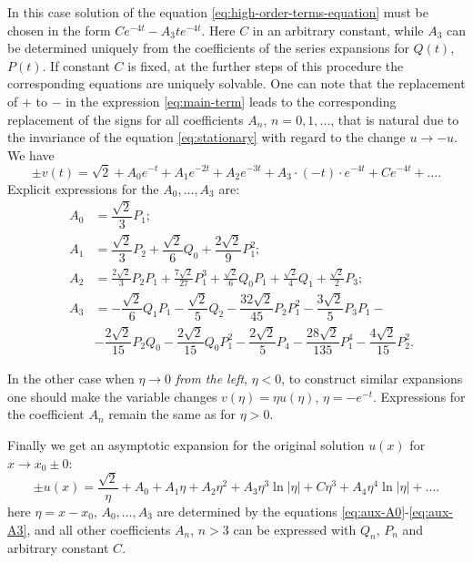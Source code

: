 In this case solution of the equation \eqref{eq:high-order-terms-equation} must be chosen in the form $Ce^{-4t} - A_3 t e^{-4t}$.
Here $C$ in an arbitrary constant, while $A_3$ can be determined uniquely from the coefficients of the series expansions for $Q(t)$, $P(t)$.
If constant $C$ is fixed, at the further steps of this procedure the corresponding equations are uniquely solvable.
One can note that the replacement of $+$ to $-$ in the expression \eqref{eq:main-term} leads to the corresponding replacement of the signs for all coefficients $A_n$, $n = 0, 1,...$, that is natural due to the invariance of the equation \eqref{eq:stationary} with regard to the change $u \to -u$.
We have
\begin{equation}
	\pm v(t) = \sqrt{2} + A_0 e^{-t} + A_1 e^{-2t} + A_2 e^{-3t} + A_3 \cdot (-t) \cdot e^{-4t} + C e^{-4t} + \dots.
	\label{eq:expansion-intermediate}
\end{equation}
Explicit expressions for the $A_0, \dots, A_3$ are:
\begin{eqnarray}
	& A_0 & = \dfrac{\sqrt{2}}{3} P_1; \label{eq:aux-A0} \\
	& A_1 & = \dfrac{\sqrt{2}}{3} P_2 + \dfrac{\sqrt{2}}{6} Q_0 + \dfrac{2 \sqrt{2}}{9} P_1^2; \label{eq:aux-A1} \\
	& A_2 & = \frac{2\sqrt{2}} 3P_2 P_1 + \frac{7\sqrt{2}}{27} P_1^3 + \frac{\sqrt{2}} 6Q_0 P_1 + \frac{\sqrt{2}} 4Q_1 + \frac{\sqrt{2}} 2P_3; \label{eq:aux-A2} \\
	& A_3 & = -\dfrac{\sqrt{2}}{6} Q_1 P_1 - \dfrac{\sqrt{2}}{5} Q_2 - \dfrac{32 \sqrt{2}}{45} P_2 P_1^2 - \dfrac{3 \sqrt{2}}{5} P_3 P_1 - \\
	&& - \dfrac{2 \sqrt{2}}{15} P_2 Q_0 -\dfrac{2 \sqrt{2}}{15} Q_0 P_1^2 - \dfrac{2 \sqrt{2}}{5} P_4 - \dfrac{28 \sqrt{2}}{135} P_1^4 - \dfrac{4 \sqrt{2}}{15} P_2^2. \label{eq:aux-A3}
\end{eqnarray}

In the other case when $\eta \to 0$ {\it from the left}, $\eta < 0$, to construct similar expansions one should make the variable changes $v(\eta) = \eta u(\eta)$, $\eta = -e^{-t}$.
Expressions for the coefficient $A_n$ remain the same as for $\eta > 0$.

Finally we get an asymptotic expansion for the original solution $u(x)$ for $x \to x_0 \pm 0$:
\begin{equation}
	\pm u(x) = \dfrac{\sqrt{2}}{\eta} + A_0 + A_1 \eta + A_2 \eta^2 + A_3 \eta^3 \ln |\eta| + C \eta^3+ A_4 \eta^4 \ln |\eta| + \dots.
	\label{eq:expansion}
\end{equation}
here $\eta = x - x_0$, $A_0, \dots, A_3$ are determined by the equations \eqref{eq:aux-A0}-\eqref{eq:aux-A3}, and all other coefficients $A_n$, $n > 3$ can be expressed with $Q_n$, $P_n$ and arbitrary constant $C$.

